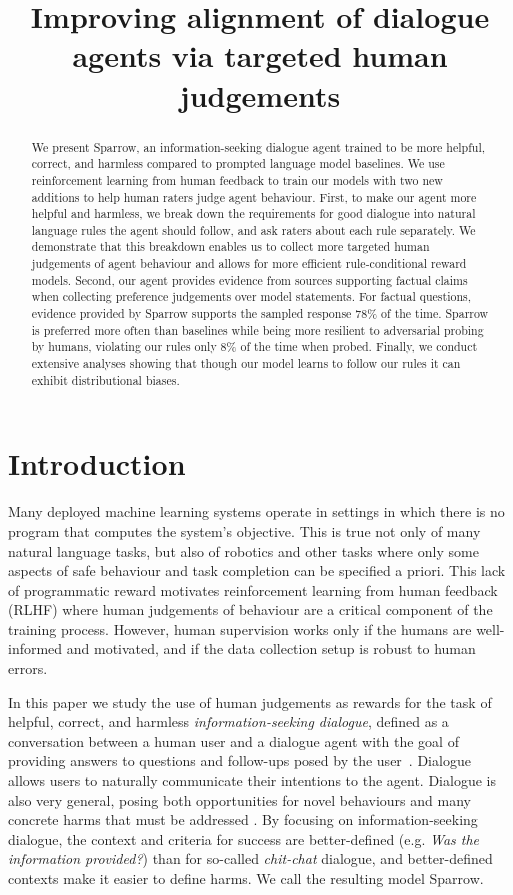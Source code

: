 \title{Improving alignment of dialogue agents via targeted human judgements}

\begin{abstract}
We present Sparrow, an information-seeking dialogue agent trained to be more helpful, correct, and harmless compared to prompted language model baselines.  We use reinforcement learning from human feedback to train our models with two new additions to help human raters judge agent behaviour.  First, to make our agent more helpful and harmless, we break down the requirements for good dialogue into natural language rules the agent should follow, and ask raters about each rule separately.  We demonstrate that this breakdown enables us to collect more targeted human judgements of agent behaviour and allows for more efficient rule-conditional reward models.  Second, our agent provides evidence from sources supporting factual claims when collecting preference judgements over model statements.  For factual questions, evidence provided by Sparrow supports the sampled response 78\% of the time.  Sparrow is preferred more often than baselines while being more resilient to adversarial probing by humans, violating our rules only 8\% of the time when probed.  Finally, we conduct extensive analyses showing that though our model learns to follow our rules it can exhibit distributional biases.
\end{abstract}

\section{Introduction}
\label{sec:intro}

Many deployed machine learning systems operate in settings in which there is no program that computes the system's objective. This is true not only of many natural language tasks, but also of robotics and other tasks where only some aspects of safe behaviour and task completion can be specified a priori. This lack of programmatic reward motivates reinforcement learning from human feedback (RLHF) where human judgements of behaviour are a critical component of the training process. However, human supervision works only if the humans are well-informed and motivated, and if the data collection setup is robust to human errors.

In this paper we study the use of human judgements as rewards for the task of helpful, correct, and harmless \emph{information-seeking dialogue}, defined as a conversation between a human user and a dialogue agent with the goal of providing answers to questions and follow-ups posed by the user~\citep{zamani2022conversational}. Dialogue allows users to naturally communicate their intentions to the agent. Dialogue is also very general, posing both opportunities for novel behaviours and many concrete harms that must be addressed \citep{bender2021dangers, weidinger2021ethical}. By focusing on information-seeking dialogue, the context and criteria for success are better-defined (e.g. \emph{Was the information provided?}) than for so-called \emph{chit-chat} dialogue, and better-defined contexts make it easier to define harms. We call the resulting model Sparrow.

